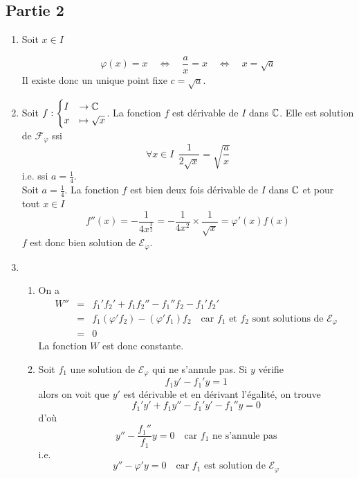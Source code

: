 \subsection*{Partie 2}
\begin{enumerate}
\item Soit $x\in I$

$$
\varphi(x)=x \quad \Leftrightarrow \quad \frac ax=x \quad \Leftrightarrow \quad x=\sqrt{a}
$$
Il existe donc un unique point fixe $c=\sqrt a$.
\item Soit $f : \begin{cases}I &\rightarrow \mathbb{C} \\ x &\mapsto \sqrt{x} \end{cases}$. La fonction $f$ est dérivable de $I$ dans $\mathbb{C}$. Elle est solution de $\mathcal F_\varphi$ ssi 
$$\forall x\in I\ \  \frac 1{2\sqrt x}=\sqrt{\frac ax}$$
i.e. ssi $a=\frac 14$.\\
Soit $a=\frac 14$. La fonction  $f$ est bien deux fois dérivable de $I$ dans $\mathbb{C}$ et pour tout $x\in I$
$$f''(x)=-\frac 1{4x^{\frac 32}}=-\frac 1{4x^{2}}\times \frac 1{\sqrt x}=\varphi'(x)f(x)$$
$f$ est donc bien solution de $\mathcal E_\varphi$.
\item 
\begin{enumerate}
\item On a 
\begin{eqnarray*}
W''&=&f_1'f_2'+f_1f_2''-f_1''f_2-f_1'f_2'\\
&=&f_1(\varphi'f_2)-(\varphi'f_1)f_2\quad \text{car $f_1$ et $f_2$ sont solutions de $\mathcal E_\varphi$}\\
&=&0
\end{eqnarray*}
La fonction $W$ est donc constante.
\item Soit $f_1$ une solution de  $\mathcal E_\varphi$ qui ne s'annule pas. Si $y$ vérifie 
$$f_1y'-f_1'y=1$$
alors on voit que $y'$ est dérivable et en dérivant l'égalité, on trouve
$$ f_1'y'+f_1y''-f_1'y'-f_1''y=0$$ d'où
$$y''-\frac{f_1''}{f_1}y=0\quad\text{car $f_1$ ne s'annule pas}$$
i.e. $$y'' -\varphi'y=0\quad \text{car $f_1$ est solution de $\mathcal E_\varphi$}$$


\end{enumerate}
\end{enumerate}
